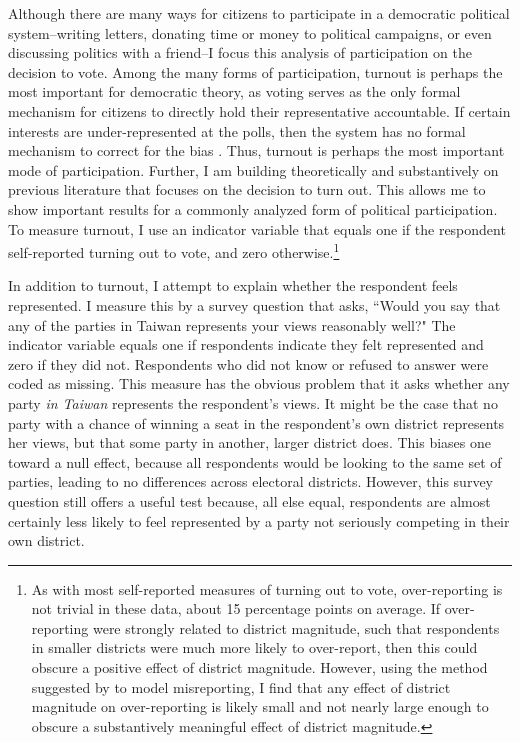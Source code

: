 \documentclass[12pt]{article}
\begin{document}
Although there are many ways for citizens to participate in a democratic political system--writing letters, donating time or money to political campaigns, or even discussing politics with a friend--I focus this analysis of participation on the decision to vote. Among the many forms of participation, turnout is perhaps the most important for democratic theory, as voting serves as the only formal mechanism for citizens to directly hold their representative accountable. If certain interests are under-represented at the polls, then the system has no formal mechanism to correct for the bias \citep{Lijphart1997, Lijphart1999}. Thus, turnout is perhaps the most important mode of participation. Further, I am building theoretically and substantively on previous literature that focuses on the decision to turn out. This allows me to show important results for a commonly analyzed form of political participation. To measure turnout, I use an indicator variable that equals one if the respondent self-reported turning out to vote, and zero otherwise.\footnote{As with most self-reported measures of turning out to vote, over-reporting is not trivial in these data, about 15 percentage points on average. If over-reporting were strongly related to district magnitude, such that respondents in smaller districts were much more likely to over-report, then this could obscure a positive effect of district magnitude. However, using the method suggested by \cite{Wright1993} to model misreporting, I find that any effect of district magnitude on over-reporting is likely small and not nearly large enough to obscure a substantively meaningful effect of district magnitude.}

In addition to turnout, I attempt to explain whether the respondent feels represented. I measure this by a survey question that asks, ``Would you say that any of the parties in Taiwan represents your views reasonably well?" The indicator variable equals one if respondents indicate they felt represented and zero if they did not. Respondents who did not know or refused to answer were coded as missing. This measure has the obvious problem that it asks whether any party \textit{in Taiwan} represents the respondent's views. It might be the case that no party with a chance of winning a seat in the respondent's own district represents her views, but that some party in another, larger district does. This biases one toward a null effect, because all respondents would be looking to the same set of parties, leading to no differences across electoral districts. However, this survey question still offers a useful test because, all else equal, respondents are almost certainly less likely to feel represented by a party not seriously competing in their own district.
\end{document}
